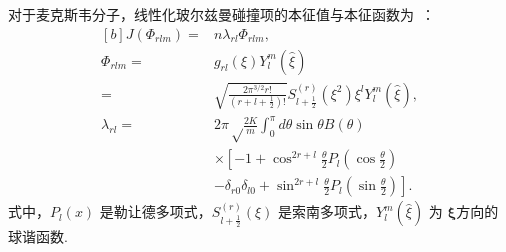 
对于麦克斯韦分子，线性化玻尔兹曼碰撞项的本征值与本征函数为~\cite{WangCS}：
\begin{equation}\label{Wang_Chang}
\begin{aligned}[b]
{J}(\Phi_{rlm})=&n\lambda_{rl}\Phi_{rlm},\\
\Phi_{rlm}=&g_{rl}(\xi)Y^m_{l}(\hat{\xi})
\\
=&\sqrt{\frac{2\pi^{3/2}r!}{\left(r+l+\frac{1}{2}\right)!}}
S^{(r)}_{l+\frac{1}{2}}(\xi^2)
\xi^l
Y^m_{l}(\hat{\xi}),\\
\lambda_{rl}=&2\pi\sqrt\frac{2K}{m}\int_0^\pi{}d\theta\sin\theta{B(\theta)}\\
&\times\left[-1+\cos^{2r+l}\frac{\theta}{2} 
P_l\left(\cos\frac{\theta}{2}\right) \right.\\
&\left. -\delta_{r0}\delta_{l0}+\sin^{2r+l}\frac{\theta}{2} 
P_l\left(\sin\frac{\theta}{2}\right)
\right].
\end{aligned} 
\end{equation}
式中，$P_l(x)$ 是勒让德多项式，$S^{(r)}_{l+\frac{1}{2}}(\xi)$ 是索南多项式，$Y^m_{l}(\hat{\xi})$ 为 $\bm{\xi}$方向的球谐函数. 


